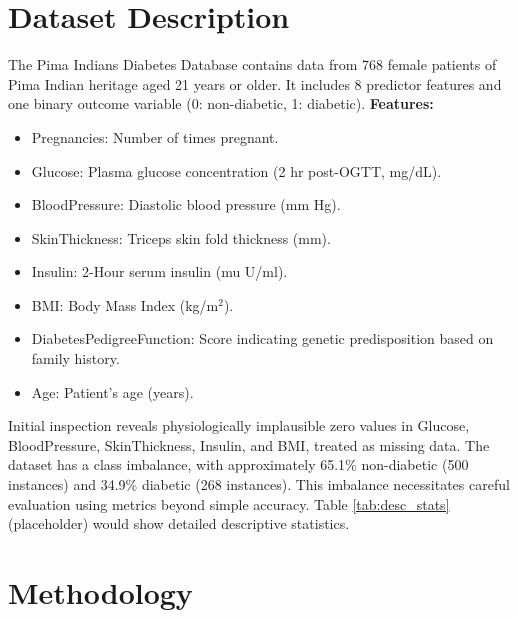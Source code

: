 \documentclass[conference]{IEEEtran}
\begin{document}
\section{Dataset Description}
The Pima Indians Diabetes Database \cite{pima_uci} contains data from 768 female patients of Pima Indian heritage aged 21 years or older. It includes 8 predictor features and one binary outcome variable (0: non-diabetic, 1: diabetic).
\textbf{Features:}
\begin{itemize}
    \item Pregnancies: Number of times pregnant.
    \item Glucose: Plasma glucose concentration (2 hr post-OGTT, mg/dL).
    \item BloodPressure: Diastolic blood pressure (mm Hg).
    \item SkinThickness: Triceps skin fold thickness (mm).
    \item Insulin: 2-Hour serum insulin (mu U/ml).
    \item BMI: Body Mass Index (kg/m$^2$).
    \item DiabetesPedigreeFunction: Score indicating genetic predisposition based on family history.
    \item Age: Patient's age (years).
\end{itemize}
Initial inspection reveals physiologically implausible zero values in Glucose, BloodPressure, SkinThickness, Insulin, and BMI, treated as missing data. The dataset has a class imbalance, with approximately 65.1\% non-diabetic (500 instances) and 34.9\% diabetic (268 instances). This imbalance necessitates careful evaluation using metrics beyond simple accuracy. Table \ref{tab:desc_stats} (placeholder) would show detailed descriptive statistics.

\section{Methodology}
\end{document}
